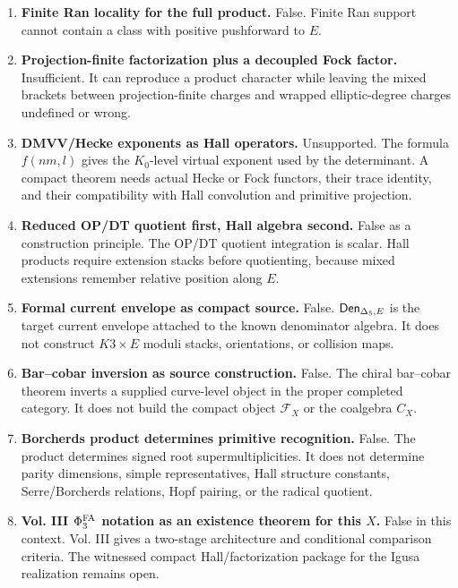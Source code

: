 \begin{enumerate}
\item \textbf{Finite Ran locality for the full product.}  False.
Finite Ran support cannot contain a class with positive pushforward to
\(E\).

\item \textbf{Projection-finite factorization plus a decoupled Fock
factor.}  Insufficient.  It can reproduce a product character while
leaving the mixed brackets between projection-finite charges and wrapped
elliptic-degree charges undefined or wrong.

\item \textbf{DMVV/Hecke exponents as Hall operators.}  Unsupported.
The formula \(f(nm,l)\) gives the \(K_0\)-level virtual exponent used by
the determinant.  A compact theorem needs actual Hecke or Fock functors,
their trace identity, and their compatibility with Hall convolution and
primitive projection.

\item \textbf{Reduced OP/DT quotient first, Hall algebra second.}
False as a construction principle.  The OP/DT quotient integration is
scalar.  Hall products require extension stacks before quotienting,
because mixed extensions remember relative position along \(E\).

\item \textbf{Formal current envelope as compact source.}  False.
\(\mathsf{Den}_{\Delta_5,E}\) is the target current envelope attached to the
known denominator algebra.  It does not construct \(K3\times E\)
moduli stacks, orientations, or collision maps.

\item \textbf{Bar--cobar inversion as source construction.}  False.
The chiral bar--cobar theorem inverts a supplied curve-level object in
the proper completed category.  It does not build the compact object
\(\mathcal F_X\) or the coalgebra \(C_X\).

\item \textbf{Borcherds product determines primitive recognition.}
False.  The product determines signed root supermultiplicities.  It
does not determine parity dimensions, simple representatives, Hall
structure constants, Serre/Borcherds relations, Hopf pairing, or the
radical quotient.

\item \textbf{Vol. III \(\Phi^{\mathrm{FA}}_3\) notation as an existence theorem
for this \(X\).}  False in this context.  Vol. III gives a two-stage
architecture and conditional comparison criteria.  The witnessed compact
Hall/factorization package for the Igusa realization remains open.
\end{enumerate}

